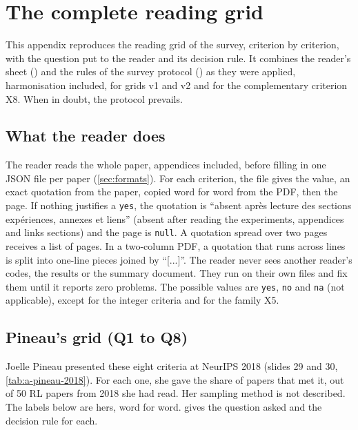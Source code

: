 \chapter{The complete reading grid}
\label{chap:A-grille}

This appendix reproduces the reading grid of the survey, criterion by criterion, with the question
put to the reader and its decision rule. It combines the reader's sheet () and
the rules of the survey protocol () as they were applied, harmonisation
included, for grids v1 and v2 and for the complementary criterion X8. When in doubt, the protocol
prevails.

\section{What the reader does}
\label{sec:a-lecteur}

The reader reads the whole paper, appendices included, before filling in one JSON file per paper
(\cref{sec:formats}). For each criterion, the file gives the value, an exact quotation from the
paper, copied word for word from the PDF, then the page. If nothing justifies a \texttt{yes}, the
quotation is \enquote{absent après lecture des sections expériences, annexes et liens} (absent after
reading the experiments, appendices and links sections) and the page is \texttt{null}. A quotation
spread over two pages receives a list of pages. In a two-column PDF, a quotation that runs across
lines is split into one-line pieces joined by \enquote{[...]}. The reader never sees another
reader's codes, the results or the summary document. They run  on
their own files and fix them until it reports zero problems. The possible values are
\texttt{yes}, \texttt{no} and \texttt{na} (not applicable), except for the integer criteria and for
the family X5.

\section{Pineau's grid (Q1 to Q8)}
\label{sec:a-pineau}

Joelle Pineau presented these eight criteria at NeurIPS 2018 (slides 29 and 30, \cref{tab:a-pineau-2018}). For each one, she
gave the share of papers that met it, out of 50 RL papers from 2018 she had read. Her sampling method is not described. The
labels below are hers, word for word.  gives the question asked and the
decision rule for each.

